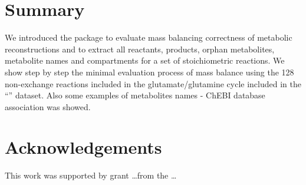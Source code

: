 \section{Summary}
We introduced the  package to evaluate mass balancing correctness of metabolic reconstructions and to extract all reactants, products, orphan metabolites, metabolite names and compartments for a set of stoichiometric reactions. We show step by step the minimal evaluation process of mass balance using the 128 non-exchange reactions included in the glutamate/glutamine cycle included in the ``'' dataset. Also some examples of metabolites names - ChEBI database association was showed.

\section{Acknowledgements}
This work was supported by grant \dots from the \dots


\address{Daniel Osorio\\
  Departamento de Ingeniería de Sistemas e Industrial\\
  Facultad de Ingeniería, Universidad Nacional de Colombia\\
  Bogotá\\
  Colombia\\}

\address{Janneth Gonzalez\\
  Grupo de Investigación en Bioquímica Experimental y Computacional\\
  Facultad de Ciencias, Pontificia Universidad Javeriana\\
  Bogotá\\
  Colombia\\}

\address{Andres Pinzon-Velasco\\
  Grupo de Investigación en Bioinformática y Biología de Sistemas\\ 
  Instituto de Genética, Universidad Nacional de Colombia\\
  Bogotá\\
  Colombia\\}
